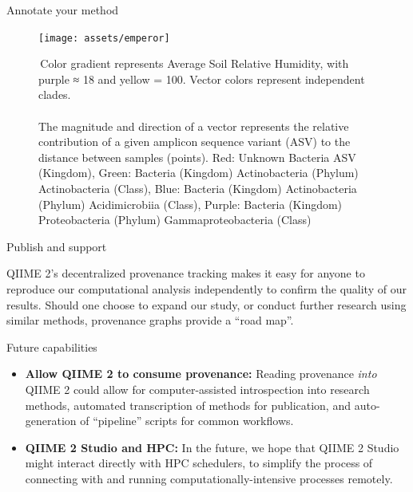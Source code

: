 \documentclass[final]{beamer}
\newlength{\colwidth}
\begin{document}
\begin{frame}[t]
\begin{columns}[t]
\begin{column}{\colwidth}
\begin{block}{Annotate your method}
    \begin{figure}[tph!]
      {\texttt{[image: assets/emperor]}}
      \caption{\,Color gradient represents Average Soil Relative Humidity, with purple ≈ 18 and yellow = 100. Vector colors represent independent clades. \\ \\The magnitude and direction of a vector represents the relative contribution of a given amplicon sequence variant (ASV) to the distance between samples (points). Red: Unknown Bacteria ASV (Kingdom), Green: Bacteria (Kingdom) Actinobacteria (Phylum) Actinobacteria (Class), Blue: Bacteria (Kingdom) Actinobacteria (Phylum) Acidimicrobiia (Class), Purple: Bacteria (Kingdom) Proteobacteria (Phylum) Gammaproteobacteria (Class)}
      \label{fig:emperor}
    \end{figure}

  \end{block}

  \begin{block}{Publish and support}

    QIIME 2’s decentralized provenance tracking makes it easy for anyone to reproduce our
    computational analysis independently to confirm the quality of our results.
    Should one choose to expand our study, or conduct further research using
    similar methods, provenance graphs provide a “road map”.

  \end{block}

  \begin{block}{Future capabilities}

    \begin{itemize}
      \item \textbf{Allow QIIME 2 to consume provenance:} Reading
      provenance \textit{into} QIIME 2 could allow for computer-assisted
      introspection into research methods, automated transcription of methods
      for publication, and auto-generation of “pipeline” scripts for common workflows.
      \item \textbf{QIIME 2 Studio and HPC:} In the future, we hope that QIIME 2 Studio might interact
      directly with HPC schedulers, to simplify the process of connecting with
      and running computationally-intensive processes remotely.
    \end{itemize}

  \end{block}


\end{column}
\end{columns}
\end{frame}
\end{document}
